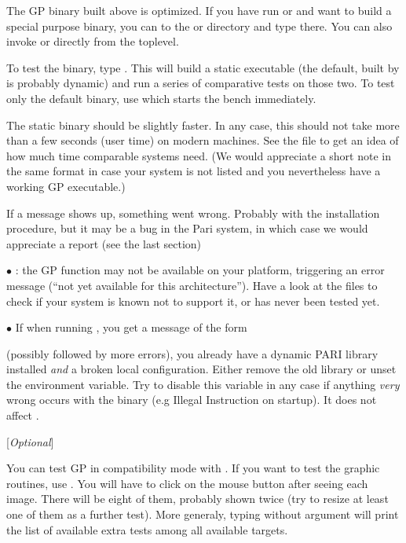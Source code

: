 The GP binary built above is optimized. If you have run  or
 and want to build a special purpose binary, you can  to the
 or  directory and type  there. You can also
invoke  or  directly from the toplevel.


To test the binary, type . This will build a static
executable (the default, built by  is probably dynamic) and
run a series of comparative tests on those two. To test only the default
binary, use  which starts the bench immediately.

The static binary should be slightly faster. In any case, this should not
take more than a few seconds (user time) on modern machines. See the file
 to get an idea of how much time comparable systems need. (We
would appreciate a short note in the same format in case your system is not
listed and you nevertheless have a working GP executable.)

If a \kbd{[BUG]} message shows up, something went wrong. Probably with the
installation procedure, but it may be a bug in the Pari system, in which
case we would appreciate a report (see the last section)


$\bullet$ : the GP function  may not be available on
your platform, triggering an error message (``not yet available for this
architecture''). Have a look at the  files to check if your
system is known not to support it, or has never been tested yet.

$\bullet$ If when running , you get a message of the form


\noindent (possibly followed by more errors), you already have a dynamic PARI
library installed {\it and\/} a broken local configuration. Either remove the
old library or unset the  environment variable. Try to
disable this variable in any case if anything {\it very} wrong occurs with
the  binary (e.g Illegal Instruction on startup). It does not
affect .

 [{\sl Optional\/}]

You can test GP in compatibility mode with . If you
want to test the graphic routines, use . You will
have to click on the mouse button after seeing each image. There will be
eight of them, probably shown twice (try to resize at least one of them
as a further test). More generaly, typing  without argument
will print the list of available extra tests among all available targets.

